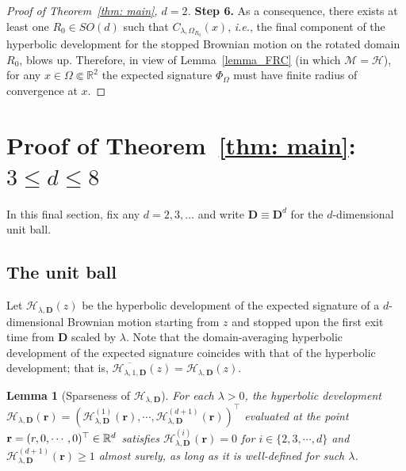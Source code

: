\documentclass[11pt,a4paper,english,reqno]{amsart}
\theoremstyle{plain}
\newtheorem{lemma}[definition]{Lemma}
\newcommand{\R}{\mathbb{R}}
\newcommand{\1}{\mathbbm{1}}
\begin{document}
\begin{proof}[Proof of Theorem~\ref{thm: main}, $d=2$]

\smallskip
\noindent
{\bf Step 6.} As a consequence, there exists at least one $R_0 \in SO(d)$ such that $C_{\lambda, \Omega_{R_0}}(x)$,  \emph{i.e.}, the final component of the hyperbolic development for the stopped Brownian motion on the rotated domain $R_0$, blows up. Therefore, in view of Lemma~\ref{lemma_FRC} (in which $\mathcal{M}=\mathcal{H}$), for any  $x \in \Omega \Subset \R^2$ the expected signature $\Phi_\Omega$ must have finite radius of convergence at $x$.    \end{proof}

\section{Proof of Theorem~\ref{thm: main}: $3\leq d \leq 8$}\label{sec: high d}

In this final section, fix any $d=2,3,\ldots$ and write $\mathbf{D}\equiv\mathbf{D}^d$ for the $d$-dimensional unit ball. 

\subsection{The unit ball}  Let $\mathcal{H}_{\lambda, \mathbf{D}}(z)$ be the hyperbolic development of the expected signature of a  $d$-dimensional Brownian motion starting from $z$ and stopped upon the first exit time from 
$\mathbf{D}$ scaled by $\lambda$. Note that the domain-averaging hyperbolic development of the  expected signature coincides with that of the hyperbolic development; that is,  $
\overline{\mathcal{H}_{\lambda, 1, \mathbf{D}}}(z) = \mathcal{H}_{\lambda, \mathbf{D}}(z)$.



\begin{lemma}[Sparseness of $\mathcal{H}_{\lambda, \mathbf{D}}$]\label{lem: sparseness}
For each $\lambda >0$, the hyperbolic development $\mathcal{H}_{\lambda, \mathbf{D}}\left(\mathbf{r}\right) = \left (\mathcal{H}^{(1)}_{\lambda, \mathbf{D}}(\mathbf{r}), \cdots, \mathcal{H}^{(d+1)}_{\lambda, \mathbf{D}}(\mathbf{r})\right )^{\top}$ evaluated at the point ${\bf r}=(r,0,\cdots,0)^\top\in \mathbb{R}^{d}$ satisfies $\mathcal{H}^{(i)}_{\lambda, \mathbf{D}}(\mathbf{r})=0$ for $i \in \{2, 3, \cdots, d\}$ and $\mathcal{H}^{(d+1)}_{\lambda, \mathbf{D}}(\mathbf{r}) \geq 1$ almost surely, as long as it is well-defined for such $\lambda$.
\end{lemma}
\end{document}
